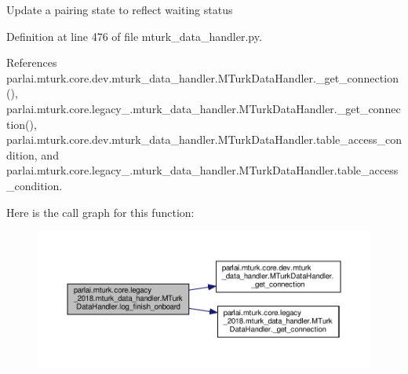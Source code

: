 \begin{DoxyVerb}Update a pairing state to reflect waiting status\end{DoxyVerb}
 

Definition at line 476 of file mturk\+\_\+data\+\_\+handler.\+py.



References parlai.\+mturk.\+core.\+dev.\+mturk\+\_\+data\+\_\+handler.\+M\+Turk\+Data\+Handler.\+\_\+get\+\_\+connection(), parlai.\+mturk.\+core.\+legacy\+\_.\+mturk\+\_\+data\+\_\+handler.\+M\+Turk\+Data\+Handler.\+\_\+get\+\_\+connection(), parlai.\+mturk.\+core.\+dev.\+mturk\+\_\+data\+\_\+handler.\+M\+Turk\+Data\+Handler.\+table\+\_\+access\+\_\+condition, and parlai.\+mturk.\+core.\+legacy\+\_.\+mturk\+\_\+data\+\_\+handler.\+M\+Turk\+Data\+Handler.\+table\+\_\+access\+\_\+condition.

Here is the call graph for this function\+:
\nopagebreak
\begin{figure}[H]
\begin{center}
\leavevmode
\includegraphics[width=350pt]{classparlai_1_1mturk_1_1core_1_1legacy__2018_1_1mturk__data__handler_1_1MTurkDataHandler_ad886593bc60aab7174f9aa255f2ab5a5_cgraph}
\end{center}
\end{figure}
\mbox{\label{classparlai_1_1mturk_1_1core_1_1legacy__2018_1_1mturk__data__handler_1_1MTurkDataHandler_a1b7db2687208e1af513fa590a6380779}} 
